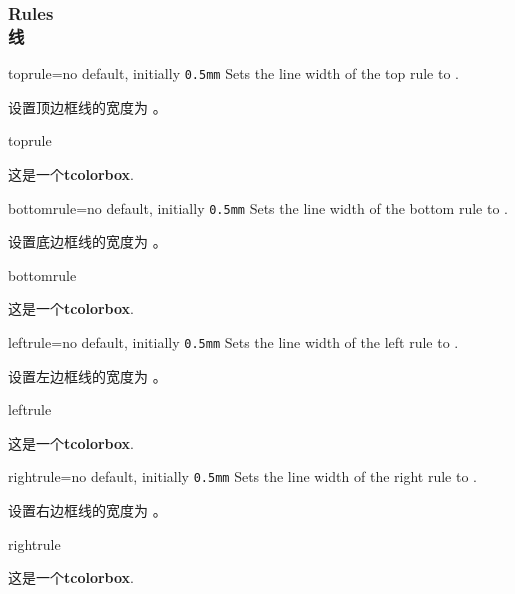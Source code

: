 \subsubsection{Rules\\线}
\begin{docTcbKey}{toprule}{=}{no default, initially \texttt{0.5mm}}
Sets the line width of the top rule to .

设置顶边框线的宽度为 。
\begin{exdispExample}{toprule}

\begin{tcolorbox}[toprule=3mm]
这是一个\textbf{tcolorbox}.
\end{tcolorbox}
\end{exdispExample}
\end{docTcbKey}


\begin{docTcbKey}{bottomrule}{=}{no default, initially \texttt{0.5mm}}
Sets the line width of the bottom rule to .

设置底边框线的宽度为 。
\begin{exdispExample}{bottomrule}

\begin{tcolorbox}[bottomrule=3mm]
这是一个\textbf{tcolorbox}.
\end{tcolorbox}
\end{exdispExample}
\end{docTcbKey}

\begin{docTcbKey}{leftrule}{=}{no default, initially \texttt{0.5mm}}
Sets the line width of the left rule to .

设置左边框线的宽度为 。
\begin{exdispExample}{leftrule}

\begin{tcolorbox}[leftrule=3mm]
这是一个\textbf{tcolorbox}.
\end{tcolorbox}
\end{exdispExample}
\end{docTcbKey}


\begin{docTcbKey}{rightrule}{=}{no default, initially \texttt{0.5mm}}
Sets the line width of the right rule to .

设置右边框线的宽度为 。
\begin{exdispExample}{rightrule}

\begin{tcolorbox}[rightrule=3mm]
这是一个\textbf{tcolorbox}.
\end{tcolorbox}
\end{exdispExample}
\end{docTcbKey}




